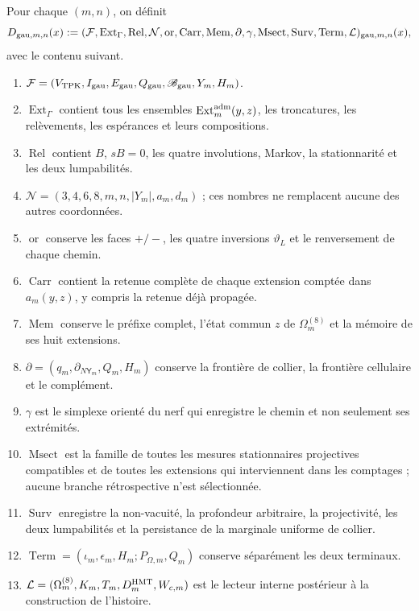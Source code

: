 Pour chaque \((m,n)\), on définit
\begin{equation}\label{eq:gauint-d-trece}
 D_{{\rm gau},m,n}(x):=
 (\mathcal F,\operatorname{Ext}_\Gamma,\operatorname{Rel},
 \mathcal N,\operatorname{or},\operatorname{Carr},\operatorname{Mem},
 \partial,\gamma,\operatorname{Msect},\operatorname{Surv},
 \operatorname{Term},\mathcal L)_{{\rm gau},m,n}(x),
\end{equation}
avec le contenu suivant.
\begin{enumerate}
 \item \(\mathcal F=(V_{\rm TPK},I_{\rm gau},E_{\rm gau},
 Q_{\rm gau},\mathscr B_{\rm gau},Y_m,H_m)\).
 \item \(\operatorname{Ext}_\Gamma\) contient tous les ensembles
 \(\operatorname{Ext}^{\rm adm}_m(y,z)\), les troncatures, les relèvements,
 les espérances et leurs compositions.
 \item \(\operatorname{Rel}\) contient \(B\), \(sB=0\), les quatre
 involutions, Markov, la stationnarité et les deux lumpabilités.
 \item \(\mathcal N=(3,4,6,8,m,n,|Y_m|,a_m,d_m)\) ; ces nombres ne
 remplacent aucune des autres coordonnées.
 \item \(\operatorname{or}\) conserve les faces \(+/-\), les quatre
 inversions \(\vartheta_L\) et le renversement de chaque chemin.
 \item \(\operatorname{Carr}\) contient la retenue complète de chaque
 extension comptée dans \(a_m(y,z)\), y compris la retenue déjà propagée.
 \item \(\operatorname{Mem}\) conserve le préfixe complet, l'état
 commun \(z\) de \(\Omega_m^{(8)}\) et la mémoire de ses huit extensions.
 \item \(\partial=(q_m,\partial_{N\mathsf Y_m},Q_m,H_m)\) conserve
 la frontière de collier, la frontière cellulaire et le complément.
 \item \(\gamma\) est le simplexe orienté du nerf qui enregistre le chemin
 et non seulement ses extrémités.
 \item \(\operatorname{Msect}\) est la famille de toutes les mesures
 stationnaires projectives compatibles et de toutes les extensions qui
 interviennent dans les comptages ; aucune branche rétrospective n'est sélectionnée.
 \item \(\operatorname{Surv}\) enregistre la non-vacuité, la profondeur
 arbitraire, la projectivité, les deux lumpabilités et la persistance de la
 marginale uniforme de collier.
 \item \(\operatorname{Term}=(\iota_m,\epsilon_m,H_m;
 P_{\Omega,m},Q_m)\) conserve séparément les deux terminaux.
 \item \(\mathcal L=(\Omega_m^{(8)},K_m,T_m,D_m^{\rm HMT},W_{c,m})\)
 est le lecteur interne postérieur à la construction de l'histoire.
\end{enumerate}

